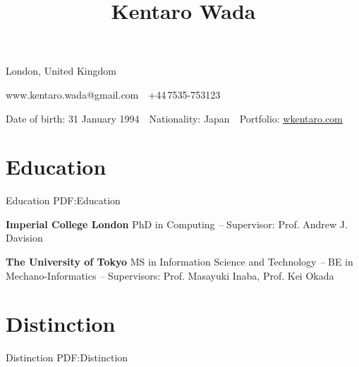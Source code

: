 \documentclass[letterpaper,MMMyyyy,nonstop]{simpleresumecv}
\newcommand{\CVAuthor}{Kentaro Wada}
\newcommand{\CVWebpage}{\href{https://wkentaro.com}{\underline{wkentaro.com}}}
\begin{document}

\title{\CVAuthor}

\begin{subtitle}
London, United Kingdom
\par
www.kentaro.wada@gmail.com
\,\SubBulletSymbol\,
+44\,7535-753123
\par
Date of birth: 31 January 1994
\,\SubBulletSymbol\,
Nationality: Japan
\,\SubBulletSymbol\,
Portfolio: \CVWebpage

\noindent\makebox[\linewidth]{\rule{0.8\paperwidth}{0.4pt}}
\end{subtitle}

\begin{body}


\section
{Education}
{Education}
{PDF:Education}

\textbf{Imperial College London}
\newline
PhD in Computing
\hfill
{\it {} -- }
\newline
Supervisor: Prof. Andrew J. Davision

\GapNoBreak

\textbf{The University of Tokyo}
\newline
MS in Information Science and Technology
\hfill
{\it {} -- }
\newline
BE in Mechano-Informatics
\hfill
{\it {} -- }
\newline
Supervisors: Prof. Masayuki Inaba, Prof. Kei Okada


%

\BigGapNoBreak

\section
{Distinction}
{Distinction}
{PDF:Distinction}


\end{body}
\end{document}
